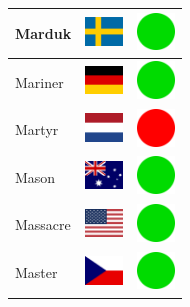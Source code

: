 \documentclass[12pt, a4paper, twoside]{report}
\begin{document}
\begin{center}
\begin{longtable}{|p{5cm}|p{2cm}|p{2cm}|}
 Marduk                                                     & \includegraphics[width=1cm]{../4x3/se} &   \includegraphics[width=1cm]{../likes/y} \\ \hline
 Mariner                                                    & \includegraphics[width=1cm]{../4x3/de} &   \includegraphics[width=1cm]{../likes/y} \\ \hline
 Martyr                                                     & \includegraphics[width=1cm]{../4x3/nl} &   \includegraphics[width=1cm]{../likes/n} \\ \hline
 Mason                                                      & \includegraphics[width=1cm]{../4x3/au} &   \includegraphics[width=1cm]{../likes/y} \\ \hline
 Massacre                                                   & \includegraphics[width=1cm]{../4x3/us} &   \includegraphics[width=1cm]{../likes/y} \\ \hline
 Master                                                     & \includegraphics[width=1cm]{../4x3/cz} &   \includegraphics[width=1cm]{../likes/y} \\ \hline

\end{longtable}
\end{center}
\end{document}
